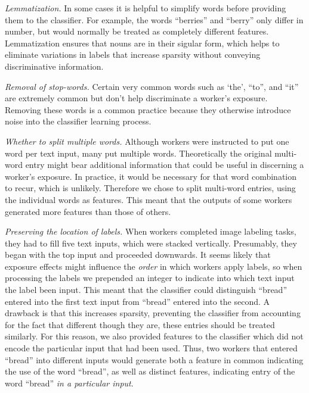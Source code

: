 \documentclass[12pt]{article}
\begin{document}
	\textit{Lemmatization.}  In some cases it is helpful to simplify words 
	before providing them to the classifier.  For example, the words 
	``berries'' and ``berry'' only differ in number, but would normally be
	treated as completely different features.  Lemmatization ensures that
	nouns are in their sigular form, which helps to eliminate variations in
	labels that increase sparsity without conveying discriminative 
	information.

	\textit{Removal of stop-words.}  Certain very common words such as `the',
	``to'', and ``it'' are extremely common but don't help discriminate a 
	worker's exposure.  Removing these words is a common practice because
	they otherwise introduce noise into the classifier learning process.

	\textit{Whether to split multiple words.}  Although workers were 
	instructed to put one word per text input, many put multiple words.
	Theoretically the original multi-word entry might bear additional 
	information that could be useful in discerning a worker's exposure. 
	In practice, it would be necessary for that word combination to recur,
	which is unlikely.  Therefore we chose to split multi-word entries,
	using the individual words as features.  This meant that the outputs of
	some workers generated more features than those of others.

	\textit{Preserving the location of labels.}  When workers completed image
	labeling tasks, they had to fill five text inputs, which were stacked
	vertically.  Presumably, they began with the top input and proceeded 
	downwards.  It seems likely that exposure effects might influence the
	\textit{order} in which workers apply labels, so when processing the 
	labels we prepended an integer to indicate into which text input the 
	label been input.  This meant that the classifier could distinguish
	``bread'' entered into the first text input from ``bread'' entered into
	the second.  A drawback is that this increases sparsity, preventing the
	classifier from accounting for the fact that different though they are,
	these entries should be treated similarly.  For this reason, we also
	provided features to the classifier which did not encode the particular
	input that had been used.  Thus, two workers that entered ``bread''
	into different inputs would generate both a feature in common indicating
	the use of the word ``bread'', as well as distinct features, indicating
	entry of the word ``bread'' \textit{in a particular input}.
\end{document}
